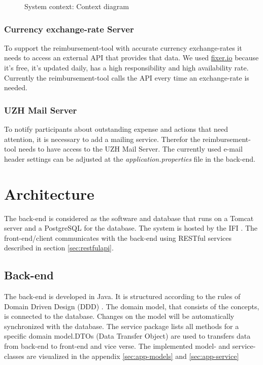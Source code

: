 \begin{figure}[H]
    \centering
    \caption{System context: Context diagram}
    \label{fig:context-diagram}
\end{figure}

\subsubsection{Currency exchange-rate Server}

To support the reimbursement-tool with accurate currency exchange-rates it needs to access an external API that provides that data. We used \url{fixer.io} \cite{fixer} because it's free,  it's updated daily, has a high responsibility and high availability rate. Currently the reimbursement-tool calls the API every time an exchange-rate is needed. 

\subsubsection{UZH Mail Server}

To notify participants about outstanding expense and actions that need attention, it is necessary to add a mailing service. Therefor the reimbursement-tool needs to have access to the UZH Mail Server.\newline
The currently used e-mail header settings can be adjusted at the \textit{application.properties} file in the back-end.\newpage



\section{Architecture}

The back-end is considered as the software and database that runs on a Tomcat \cite{tomcat} server and a PostgreSQL \cite{postgresql} for the database. The system is hosted by the IFI \cite{ifi}. The front-end/client communicates with the back-end using RESTful services described in section \ref{sec:restfulapi}.

\subsection{Back-end}
The back-end is developed in Java. It is structured according to the rules of Domain Driven Design (DDD) \cite{ddd}. The domain model, that consists of the concepts, is connected to the database. Changes on the model will be automatically synchronized with the database. The service package lists all methods for a specific domain model.\newline DTOs (Data Transfer Object) are used to transfers data from back-end to front-end and vice verse. \newline The implemented model- and service-classes are visualized in the appendix \ref{sec:app-models} and \ref{sec:app-service}  

